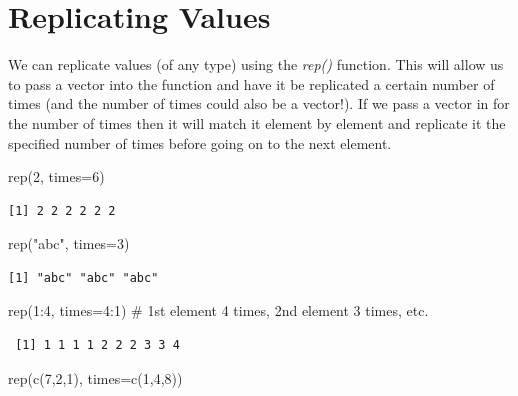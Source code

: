 \documentclass[
  letterpaper,
  DIV=11,
  numbers=noendperiod]{scrreprt}
\newenvironment{Shaded}{\begin{snugshade}}{\end{snugshade}}
\newcommand{\AttributeTok}[1]{\textcolor[rgb]{0.40,0.45,0.13}{#1}}
\newcommand{\CommentTok}[1]{\textcolor[rgb]{0.37,0.37,0.37}{#1}}
\newcommand{\DecValTok}[1]{\textcolor[rgb]{0.68,0.00,0.00}{#1}}
\newcommand{\FunctionTok}[1]{\textcolor[rgb]{0.28,0.35,0.67}{#1}}
\newcommand{\NormalTok}[1]{\textcolor[rgb]{0.00,0.23,0.31}{#1}}
\newcommand{\SpecialCharTok}[1]{\textcolor[rgb]{0.37,0.37,0.37}{#1}}
\newcommand{\StringTok}[1]{\textcolor[rgb]{0.13,0.47,0.30}{#1}}
\begin{document}
\section{Replicating Values}\label{replicating-values}

We can replicate values (of any type) using the \emph{rep()} function.
This will allow us to pass a vector into the function and have it be
replicated a certain number of times (and the number of times could also
be a vector!). If we pass a vector in for the number of times then it
will match it element by element and replicate it the specified number
of times before going on to the next element.

\begin{Shaded}
\begin{Highlighting}[]
\FunctionTok{rep}\NormalTok{(}\DecValTok{2}\NormalTok{, }\AttributeTok{times=}\DecValTok{6}\NormalTok{)}
\end{Highlighting}
\end{Shaded}

\begin{verbatim}
[1] 2 2 2 2 2 2
\end{verbatim}

\begin{Shaded}
\begin{Highlighting}[]
\FunctionTok{rep}\NormalTok{(}\StringTok{"abc"}\NormalTok{, }\AttributeTok{times=}\DecValTok{3}\NormalTok{)}
\end{Highlighting}
\end{Shaded}

\begin{verbatim}
[1] "abc" "abc" "abc"
\end{verbatim}

\begin{Shaded}
\begin{Highlighting}[]
\FunctionTok{rep}\NormalTok{(}\DecValTok{1}\SpecialCharTok{:}\DecValTok{4}\NormalTok{, }\AttributeTok{times=}\DecValTok{4}\SpecialCharTok{:}\DecValTok{1}\NormalTok{) }\CommentTok{\# 1st element 4 times, 2nd element 3 times, etc.}
\end{Highlighting}
\end{Shaded}

\begin{verbatim}
 [1] 1 1 1 1 2 2 2 3 3 4
\end{verbatim}

\begin{Shaded}
\begin{Highlighting}[]
\FunctionTok{rep}\NormalTok{(}\FunctionTok{c}\NormalTok{(}\DecValTok{7}\NormalTok{,}\DecValTok{2}\NormalTok{,}\DecValTok{1}\NormalTok{), }\AttributeTok{times=}\FunctionTok{c}\NormalTok{(}\DecValTok{1}\NormalTok{,}\DecValTok{4}\NormalTok{,}\DecValTok{8}\NormalTok{))}
\end{Highlighting}
\end{Shaded}
\end{document}
